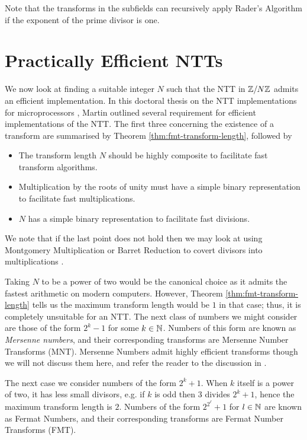 Note that the transforms in the subfields can recursively apply Rader's Algorithm if the exponent of the prime divisor is one.


\section{Practically Efficient NTTs}%
\label{sec:practically-efficient-ntt}

We now look at finding a suitable integer $N$ such that the NTT in ${\mathbb Z} / N{\mathbb Z}$ admits an efficient implementation. In this doctoral thesis on the NTT implementations for microprocessors \cite{ntt-thesis}, Martin outlined several requirement for efficient implementations of the NTT. The first three concerning the existence of a transform are summarised by Theorem \ref{thm:fmt-transform-length}, followed by
\begin{itemize}
    \item The transform length $N$ should be highly composite to facilitate fast transform algorithms.
    \item Multiplication by the roots of unity must have a simple binary representation to facilitate fast multiplications.
    \item $N$ has a simple binary representation to facilitate fast divisions.
\end{itemize}

We note that if the last point does not hold then we may look at using Montgomery Multiplication or Barret Reduction to covert divisors into multiplications \cite{barret}.

Taking $N$ to be a power of two would be the canonical choice as it admits the fastest arithmetic on modern computers. However, Theorem \ref{thm:fmt-transform-length} tells us the maximum transform length would be $1$ in that case; thus, it is completely unsuitable for an NTT. The next class of numbers we might consider are those of the form $2^k - 1$ for some $k \in {\mathbb N}$. Numbers of this form are known as \textit{Mersenne numbers}, and their corresponding transforms are Mersenne Number Transforms (MNT). Mersenne Numbers admit highly efficient transforms though we will not discuss them here, and refer the reader to the discussion in \cite{mersenne} \cite{mersenne-recent}.

The next case we consider numbers of the form $2^k + 1$. When $k$ itself is a power of two, it has less small divisors, e.g. if $k$ is odd then $3$ divides $2^k + 1$, hence the maximum transform length is $2$. Numbers of the form $2^{2^\ell} + 1$ for $l \in {\mathbb N}$ are known as Fermat Numbers, and their corresponding transforms are Fermat Number Transforms (FMT).

